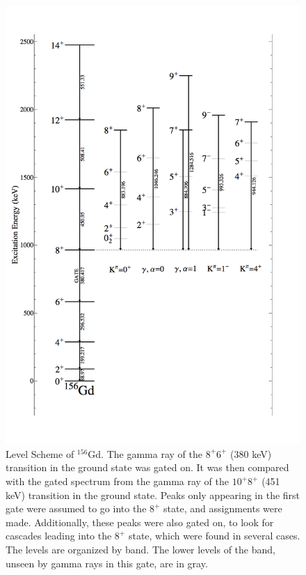 \begin{figure}
    \centering
    \includegraphics[scale=0.3]{156GdTablesAndFigs/156Gd_8to6.png}
    \caption{Level Scheme of $^{156}$Gd. The gamma ray of the $8^+$\rightarrow$6^+$ (380 keV) transition in the ground state was gated on. It was then compared with the gated spectrum from the gamma ray of the $10^+$\rightarrow$8^+$ (451 keV) transition in the ground state. Peaks only appearing in the first gate were assumed to go into the $8^+$ state, and assignments were made. Additionally, these peaks were also gated on, to look for cascades leading into the $8^+$ state, which were found in several cases. The levels are organized by band. The lower levels of the band, unseen by gamma rays in this gate, are in gray.}
    \label{fig:156_8to6}
\end{figure}